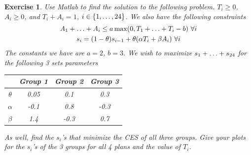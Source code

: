 \documentclass[12pt]{article}
\theoremstyle{colon}
\newtheorem{exercise}{Exercise}
\begin{document}
\begin{exercise}
  Use Matlab to find the solution to the following problem. $T_i \geq 0$, $A_i \geq 0$, and $T_i + A_i = 1$, $i \in \{ 1, \mathellipsis, 24 \}$. We also have the following constraints
  \begin{gather*}
    A_1 + \mathellipsis + A_i \leq a \max (0, T_1 + \mathellipsis + T_i - b) \ \forall i \\
    s_i = (1-\theta)s_{i-1} + \theta (\alpha T_i + \beta A_i) \ \forall i
  \end{gather*}
  The constants we have are $a = 2$, $b = 3$. We wish to maximize $s_1 + \mathellipsis + s_{24}$ for the following 3 sets parameters
  \begin{center}
    \begin{tabular}{|c|c|c|c|}
      \cline{2-4}
      \multicolumn{1}{c|}{}
      & Group 1 & Group 2 & Group 3 \\
      \hline
      $\theta$ & 0.05 & 0.1 & 0.3 \\
      \hline
      $\alpha$ & -0.1 & 0.8 & -0.3 \\
      \hline
      $\beta$ & 1.4 & -0.3 & 0.7 \\
      \hline
    \end{tabular}
  \end{center}
  As well, find the $s_i$'s that minimize the CES of all three groups. Give your plots for the $s_i$'s of the 3 groups for all 4 plans and the value of $T_i$.
\end{exercise}
\end{document}

